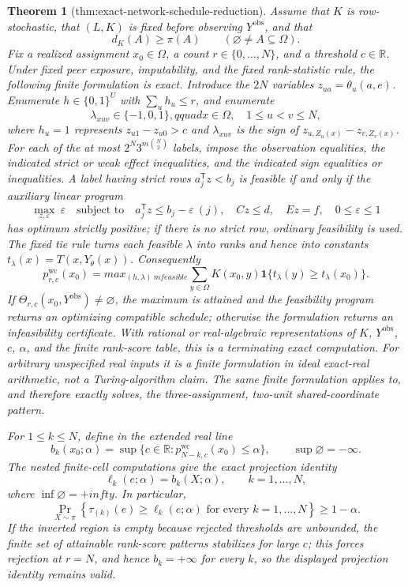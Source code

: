 \documentclass{article}
\newtheorem{theorem}{Theorem}
\begin{document}
\begin{theorem}[thm:exact-network-schedule-reduction]\label{thm:exact-network-schedule-reduction}
Assume that \(K\) is row-stochastic, that \((L,K)\) is fixed before observing \(Y^{\mathrm{obs}}\), and that
\[
d_K(A)\geq \pi(A)\qquad
(\varnothing\neq A\subseteq\Omega).
\]
Fix a realized assignment \(x_0\in\Omega\), a count \(r\in\{0,\ldots,N\}\), and a threshold \(c\in\mathbb R\).  Under fixed peer exposure, imputability, and the fixed rank-statistic rule, the following finite formulation is exact.  Introduce the \(2N\) variables \(z_{ua}=\theta_u(a,e)\).  Enumerate \(h\in\{0,1\}^{U}\) with \(\sum_u h_u\leq r\), and enumerate
\[
\lambda_{xuv}\in\{-1,0,1\},qquad
x\in\Omega,\quad 1\leq u<v\leq N,
\]
where \(h_u=1\) represents \(z_{u1}-z_{u0}>c\) and \(\lambda_{xuv}\) is the sign of \(z_{u,Z_u(x)}-z_{v,Z_v(x)}\).  For each of the at most
\(2^N3^{m\binom N2}\) labels, impose the observation equalities, the indicated strict or weak effect inequalities, and the indicated sign equalities or inequalities.  A label having strict rows \(a_j^{\mathsf T}z<b_j\) is feasible if and only if the auxiliary linear program
\[
\max_{z,\varepsilon}\ \varepsilon
\quad\text{subject to}\quad
a_j^{\mathsf T}z\leq b_j-\varepsilon\ (j),
\quad Cz\leq d,
\quad Ez=f,
\quad 0\leq\varepsilon\leq1
\]
has optimum strictly positive; if there is no strict row, ordinary feasibility is used.  The fixed tie rule turns each feasible \(\lambda\) into ranks and hence into constants \(t_\lambda(x)=T(x,Y_\theta(x))\).  Consequently
\[
p^{\mathrm{wc}}_{r,c}(x_0)
=max_{(h,\lambda)\ {
m feasible}}
\sum_{y\in\Omega}K(x_0,y)
\mathbf 1\{t_\lambda(y)\geq t_\lambda(x_0)\}.
\]
If \(\Theta_{r,c}(x_0,Y^{\mathrm{obs}})\neq\varnothing\), the maximum is attained and the feasibility program returns an optimizing compatible schedule; otherwise the formulation returns an infeasibility certificate.  With rational or real-algebraic representations of \(K\), \(Y^{\mathrm{obs}}\), \(c\), \(\alpha\), and the finite rank-score table, this is a terminating exact computation.  For arbitrary unspecified real inputs it is a finite formulation in ideal exact-real arithmetic, not a Turing-algorithm claim.  The same finite formulation applies to, and therefore exactly solves, the three-assignment, two-unit shared-coordinate pattern.

For \(1\leq k\leq N\), define in the extended real line
\[
b_k(x_0;\alpha)
=\sup\{c\in\mathbb R:
p^{\mathrm{wc}}_{N-k,c}(x_0)\leq\alpha\},
\qquad \sup\varnothing=-\infty.
\]
The nested finite-cell computations give the exact projection identity
\[
\ell_k(e;\alpha)=b_k(X;\alpha),
\qquad k=1,\ldots,N,
\]
where \(\inf\varnothing=+infty\).  In particular,
\[
\Pr_{X\sim\pi}\!\left\{
\tau_{(k)}(e)\geq\ell_k(e;\alpha)
\text{ for every }k=1,\ldots,N
\right\}\geq1-\alpha.
\]
If the inverted region is empty because rejected thresholds are unbounded, the finite set of attainable rank-score patterns stabilizes for large \(c\); this forces rejection at \(r=N\), and hence \(b_k=+\infty\) for every \(k\), so the displayed projection identity remains valid.


\end{theorem}
\end{document}
